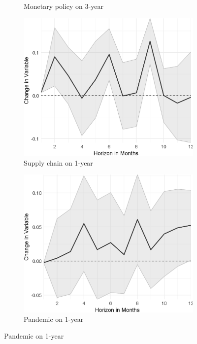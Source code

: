 \begin{figure}[H]
\begin{subfigure}{00.32\textwidth}
	\caption{Monetary policy on 3-year}
\end{subfigure}
\begin{subfigure}{00.32\textwidth}
	\includegraphics[width=1\textwidth]{output/lp/baseline/diff/supply_chain/supply_chainonexpectations1y_djn.eps}
	\caption{Supply chain on 1-year}
\end{subfigure}
\begin{subfigure}{00.32\textwidth}
	\includegraphics[width=1\textwidth]{output/lp/baseline/diff/pandemic/pandemiconexpectations1y_djn.eps}
	\caption{Pandemic on 1-year}
\end{subfigure}

\end{figure}
